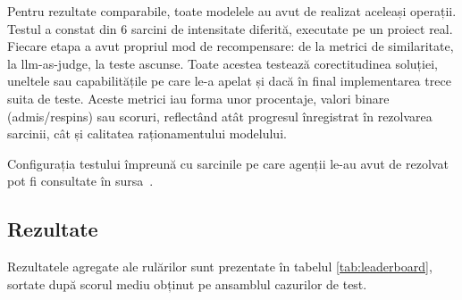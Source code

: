 \documentclass[12pt, a4paper, oneside, romanian]{teza-upb}
\begin{document}
  Pentru rezultate comparabile, toate modelele au avut de realizat aceleași operații. Testul a constat din 6 sarcini
  de intensitate diferită, executate pe un proiect real. Fiecare etapa a avut propriul mod de recompensare: de la metrici de similaritate, la \ac{llm}-as-judge, la teste ascunse. Toate
  acestea testează corectitudinea soluției, uneltele sau capabilitățile pe care le-a apelat și dacă în final implementarea trece suita de teste. 
  Aceste metrici iau forma unor procentaje, valori binare (admis/respins) sau scoruri, reflectând atât progresul înregistrat în rezolvarea sarcinii, cât și calitatea raționamentului modelului.

  Configurația testului împreună cu sarcinile pe care agenții le-au avut de rezolvat pot fi consultate în sursa~\cite{gist_eval_config}.

  \subsection{Rezultate}

  Rezultatele agregate ale rulărilor sunt prezentate în tabelul \ref{tab:leaderboard}, sortate după scorul mediu obținut pe ansamblul cazurilor de test.
\end{document}
